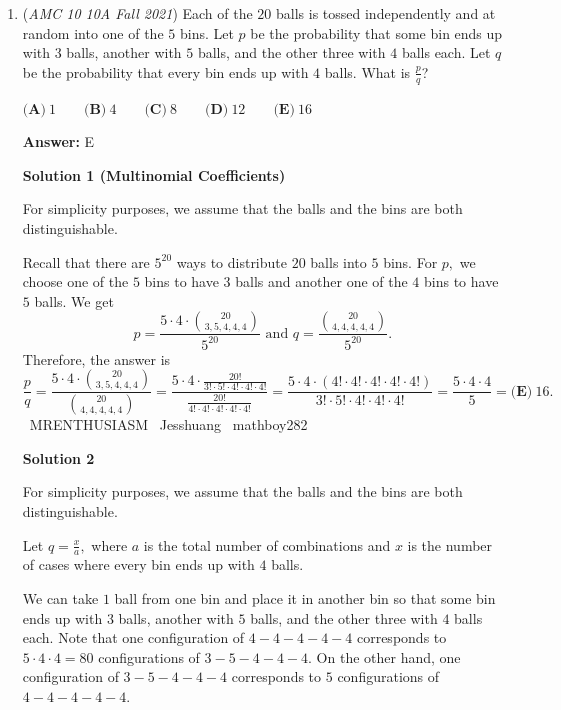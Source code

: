 \begin{enumerate}
 \begin{verbatim}
Note: This link’s to a different problem. I can't find OmegaLearn's solution to this problem in the video.
\end{verbatim}




	\item (\textit{AMC 10 10A Fall 2021}) Each of the $20$ balls is tossed independently and at random into one of the $5$ bins. Let $p$ be the probability that some bin ends up with $3$ balls, another with $5$ balls, and the other three with $4$ balls each. Let $q$ be the probability that every bin ends up with $4$ balls. What is \(\frac{p}{q}\)?


 $\textbf{(A)}\ 1 \qquad\textbf{(B)}\  4 \qquad\textbf{(C)}\  8 \qquad\textbf{(D)}\  12 \qquad\textbf{(E)}\ 16$

 \textbf{Answer: }E



\textbf{Solution 1 (Multinomial Coefficients)}

For simplicity purposes, we assume that the balls and the bins are both distinguishable.

 Recall that there are $5^{20}$ ways to distribute $20$ balls into $5$ bins. For $p,$ we choose one of the $5$ bins to have $3$ balls and another one of the $4$ bins to have $5$ balls. We get
 \[p=\frac{5\cdot4\cdot\binom{20}{3,5,4,4,4}}{5^{20}} \text{ and } q=\frac{\binom{20}{4,4,4,4,4}}{5^{20}}.\] Therefore, the answer is 
 \[\frac pq=\frac{5\cdot4\cdot\binom{20}{3,5,4,4,4}}{\binom{20}{4,4,4,4,4}}=\frac{5\cdot4\cdot\frac{20!}{3!\cdot5!\cdot4!\cdot4!\cdot4!}}{\frac{20!}{4!\cdot4!\cdot4!\cdot4!\cdot4!}}=\frac{5\cdot4\cdot(4!\cdot4!\cdot4!\cdot4!\cdot4!)}{3!\cdot5!\cdot4!\cdot4!\cdot4!}=\frac{5\cdot4\cdot4}{5}=\boxed{\textbf{(E)}\ 16}.\]~MRENTHUSIASM ~Jesshuang ~mathboy282

 



\textbf{Solution 2}

For simplicity purposes, we assume that the balls and the bins are both distinguishable.

 Let $q=\frac{x}{a},$ where $a$ is the total number of combinations and $x$ is the number of cases where every bin ends up with $4$ balls.

 We can take $1$ ball from one bin and place it in another bin so that some bin ends up with $3$ balls, another with $5$ balls, and the other three with $4$ balls each. Note that one configuration of $4{-}4{-}4{-}4{-}4$ corresponds to $5\cdot4\cdot4=80$ configurations of $3{-}5{-}4{-}4{-}4.$ On the other hand, one configuration of $3{-}5{-}4{-}4{-}4$ corresponds to $5$ configurations of $4{-}4{-}4{-}4{-}4.$


\end{enumerate}
